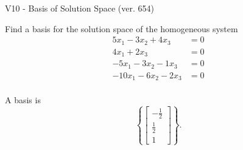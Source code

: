 \begin{exercise}
  \begin{exerciseTitle}V10 - Basis of Solution Space (ver. 654)\end{exerciseTitle}
  \begin{exerciseStatement}
    Find a basis for the solution space of the homogeneous system 
\begin{align*}
 5 x_ 1 -3 x_ 2 + 4 x_ 3 &= 0  \\ 
  4 x_ 1 + 2 x_ 3 &= 0  \\ 
  -5 x_ 1 -3 x_ 2 -1 x_ 3 &= 0  \\ 
  -10 x_ 1 -6 x_ 2 -2 x_ 3 &= 0  \\ 
 \end{align*}


 
  \end{exerciseStatement}

  \begin{exerciseAnswer}
   A basis is   
\[\left\{\left[\begin{array}{c}
-\frac{1}{2} \\
\frac{1}{2} \\
1
\end{array}\right]\right\}.\]

  


  \end{exerciseAnswer}
\end{exercise}